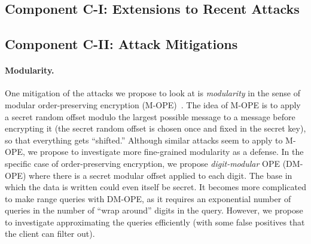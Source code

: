 
\subsection{Component C-I: Extensions to Recent Attacks}

\subsection{Component C-II:  Attack Mitigations}

\paragraph*{Modularity.}  One mitigation of the attacks we propose to look at is \emph{modularity} in the sense of modular order-preserving encryption (M-OPE)~\cite{C:BolCheOne11}.  The idea of M-OPE is to apply a secret random offset modulo the largest possible message to a message before encrypting it (the secret random offset is chosen once and fixed in the secret key), so that everything gets ``shifted.''  Although similar attacks seem to apply to M-OPE, we propose to investigate more fine-grained modularity as a defense.  In the specific case of order-preserving encryption, we propose \emph{digit-modular} OPE (DM-OPE) where there is a secret modular offset applied to each digit.  The base in which the data is written could even itself be secret.  It becomes more complicated to make range queries with DM-OPE, as it requires an exponential number of queries in the number of ``wrap around'' digits in the query.  However, we propose to investigate approximating the queries efficiently (with some false positives that the client can filter out).


